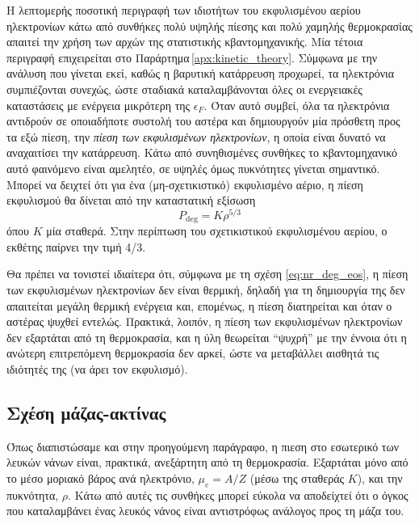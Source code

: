 Η λεπτομερής ποσοτική περιγραφή των ιδιοτήτων του εκφυλισμένου αερίου ηλεκτρονίων κάτω από συνθήκες πολύ υψηλής πίεσης και πολύ χαμηλής θερμοκρασίας απαιτεί την χρήση των αρχών της στατιστικής κβαντομηχανικής. Μία τέτοια περιγραφή επιχειρείται στο Παράρτημα\,\ref{apx:kinetic_theory}. Σύμφωνα με την ανάλυση που γίνεται εκεί, καθώς η βαρυτική κατάρρευση προχωρεί, τα ηλεκτρόνια συμπιέζονται συνεχώς, ώστε σταδιακά καταλαμβάνονται όλες οι ενεργειακές καταστάσεις με ενέργεια μικρότερη της $\epsilon_F$. Όταν αυτό συμβεί, όλα τα ηλεκτρόνια αντιδρούν σε οποιαδήποτε συστολή του αστέρα και δημιουργούν μία πρόσθετη προς τα εξώ πίεση, την \textit{πίεση των εκφυλισμένων ηλεκτρονίων}, η οποία είναι δυνατό να αναχαιτίσει την κατάρρευση. Κάτω από συνηθισμένες συνθήκες το κβαντομηχανικό αυτό φαινόμενο είναι αμελητέο, σε υψηλές όμως πυκνότητες γίνεται σημαντικό. Μπορεί να δειχτεί ότι για ένα (μη-σχετικιστικό) εκφυλισμένο αέριο, η πίεση εκφυλισμού θα δίνεται από την καταστατική εξίσωση
\begin{equation}
	P_{\text{deg}} = K \rho^{5/3}
    \label{eq:nr_deg_eos}
\end{equation}όπου $K$ μία σταθερά. Στην περίπτωση του σχετικιστικού εκφυλισμένου αερίου, ο εκθέτης παίρνει την τιμή 4/3.

Θα πρέπει να τονιστεί ιδιαίτερα ότι, σύμφωνα με τη σχέση \eqref{eq:nr_deg_eos}, η πίεση των εκφυλισμένων ηλεκτρονίων δεν είναι θερμική, δηλαδή για τη δημιουργία της δεν απαιτείται μεγάλη θερμική ενέργεια και, επομένως, η πίεση διατηρείται και όταν ο αστέρας ψυχθεί εντελώς. Πρακτικά, λοιπόν, η πίεση των εκφυλισμένων ηλεκτρονίων δεν εξαρτάται από τη θερμοκρασία, και η ύλη θεωρείται ``ψυχρή'' με την έννοια ότι η ανώτερη επιτρεπόμενη θερμοκρασία δεν αρκεί, ώστε να μεταβάλλει αισθητά τις ιδιότητές της (να άρει τον εκφυλισμό).

\subsection{Σχέση μάζας-ακτίνας}
Όπως διαπιστώσαμε και στην προηγούμενη παράγραφο, η πιεση στο εσωτερικό των λευκών νάνων είναι, πρακτικά, ανεξάρτητη από τη θερμοκρασία. Εξαρτάται μόνο από το μέσο μοριακό βάρος ανά ηλεκτρόνιο, $\mu_e = A/Z$ (μέσω της σταθεράς $K$), και την πυκνότητα, $\rho$. Κάτω από αυτές τις συνθήκες μπορεί εύκολα να αποδείχτεί ότι ο όγκος που καταλαμβάνει ένας λευκός νάνος είναι αντιστρόφως ανάλογος προς τη μάζα του.

